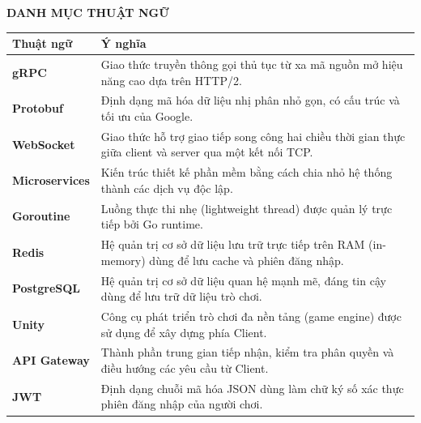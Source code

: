 \documentclass[../Project.tex]{subfiles}
\begin{document}
\begin{center}
    \Large{\textbf{DANH MỤC THUẬT NGỮ}}\\
\end{center}
\vspace{1cm}

\begin{longtable}{p{4cm} p{10cm}}
	\hline
   \textbf{Thuật ngữ}  & \textbf{Ý nghĩa} \\ \hline 
	\textbf{gRPC} & Giao thức truyền thông gọi thủ tục từ xa mã nguồn mở hiệu năng cao dựa trên HTTP/2. \\
	\textbf{Protobuf} & Định dạng mã hóa dữ liệu nhị phân nhỏ gọn, có cấu trúc và tối ưu của Google. \\
	\textbf{WebSocket} & Giao thức hỗ trợ giao tiếp song công hai chiều thời gian thực giữa client và server qua một kết nối TCP. \\
	\textbf{Microservices} & Kiến trúc thiết kế phần mềm bằng cách chia nhỏ hệ thống thành các dịch vụ độc lập. \\
	\textbf{Goroutine} & Luồng thực thi nhẹ (lightweight thread) được quản lý trực tiếp bởi Go runtime. \\
	\textbf{Redis} & Hệ quản trị cơ sở dữ liệu lưu trữ trực tiếp trên RAM (in-memory) dùng để lưu cache và phiên đăng nhập. \\
	\textbf{PostgreSQL} & Hệ quản trị cơ sở dữ liệu quan hệ mạnh mẽ, đáng tin cậy dùng để lưu trữ dữ liệu trò chơi. \\
	\textbf{Unity} & Công cụ phát triển trò chơi đa nền tảng (game engine) được sử dụng để xây dựng phía Client. \\
	\textbf{API Gateway} & Thành phần trung gian tiếp nhận, kiểm tra phân quyền và điều hướng các yêu cầu từ Client. \\
	\textbf{JWT} & Định dạng chuỗi mã hóa JSON dùng làm chữ ký số xác thực phiên đăng nhập của người chơi. \\
    \hline
\end{longtable}
\end{document}
